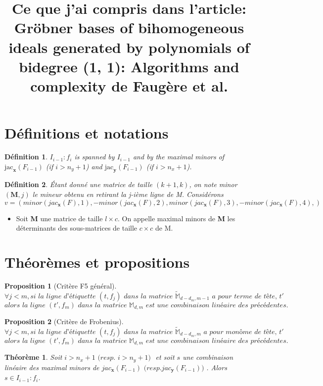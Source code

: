 \documentclass[french]{article}
\title{Ce que j'ai compris dans l'article: Gröbner bases of bihomogeneous ideals generated by polynomials of bidegree (1, 1): Algorithms and complexity de Faugère et al.}
\newtheorem{proposition}{Proposition}[section]
\newtheorem{definition}{Définition}[section]
\newtheorem{theoreme}{Théorème}[section]
\newcommand{\propositionTitre}[2]{
	\begin{proposition}[#1]
		#2
	\end{proposition}
}
\begin{document}
\maketitle

\section{Définitions et notations}
\begin{definition}
\item $I_{i-1}:f_i$ is spanned by $I_{i-1}$ and by the maximal minors of $\text{jac}_{\textbf{x}}(F_{i-1})$ (if $i > n_y + 1$) and $\text{jac}_{\textbf{y}}(F_{i-1})$ (if $i > n_x + 1$).
\end{definition}

\begin{definition}
Étant donné une matrice de taille $(k+1, k)$, on note minor$(\textbf{M}, j)$ le mineur obtenu en retirant la j-ième ligne de M. Considérons
$$v = (minor(jac_\textbf{x}(F), 1), -minor(jac_\textbf{x}(F), 2),
minor(jac_\textbf{x}(F), 3), -minor(jac_\textbf{x}(F), 4),)$$
\end{definition}

\begin{itemize}
	\item Soit \textbf{M} une matrice de taille $l \times c$. On appelle maximal 
	minors de \textbf{M} les déterminants des sous-matrices de taille $c \times c$
	de M.
\end{itemize}

\section{Théorèmes et propositions}
\propositionTitre{Critère F5 général}{
$$\forall j < m, \textit{si la ligne d'étiquette }(t,f_j) \textit{ dans la matrice } 
\tilde{\mathbb{M}}_{d-d_m, m-1} \textit{ a pour terme de tête, } t'$$
$$	\textit{alors la ligne } 
(t', f_m) \textit{ dans la matrice } \mathbb{M}_{d, m} \textit{ est une combinaison linéaire des précédentes.}$$
}

\propositionTitre{Critère de Frobenius}{
$$\forall j < m, \textit{si la ligne d'étiquette }(t,f_j) \textit{ dans la matrice } 
\tilde{\mathbb{M}}_{d-d_m, m} \textit{ a pour monôme de tête, } t'$$
$$	\textit{alors la ligne } 
(t', f_m) \textit{ dans la matrice } \mathbb{M}_{d, m} \textit{ est une combinaison linéaire des précédentes.}$$
}

\begin{theoreme}
Soit $i > n_x + 1 \textit{ (resp. } i > n_y + 1\textit{) }$ et soit $s$ une 
combinaison linéaire des maximal minors de $jac_\textbf{x}(F_{i-1}) 
\textit{ (resp.} jac_\textbf{y}(F_{i-1}) \textit{) }$. Alors $s \in I_{i-1}:f_i$.
\end{theoreme}
\end{document}
